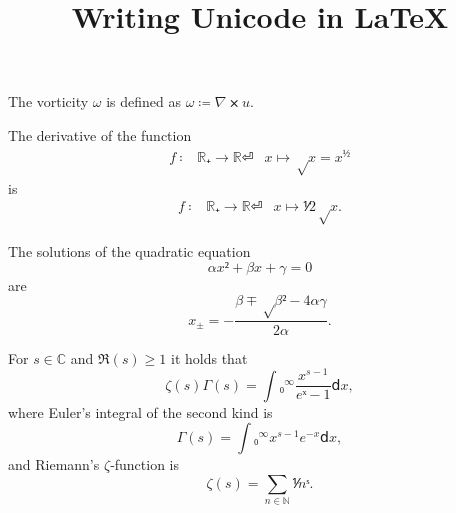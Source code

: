 \documentclass{article}
\title{Writing Unicode in \LaTeX{}}
\begin{document}
	\maketitle
	The vorticity $ω$ is defined as $ω ≔ ∇⨯ u$.

	The derivative of the function
	\begin{align}
		f∶& ℝ₊→ ℝ ⏎
		  &x↦ √x= x^{½}
	\end{align}
	is
	\begin{align}
		f∶& ℝ₊→ ℝ ⏎
		  &x↦ ⅟{2√x}.
	\end{align}

	The solutions of the quadratic equation
	\[	α x²+ β x+ γ= 0 \]
	are
	\[	x_±= -\frac{β ∓ √{β² - 4αγ}}{2α}.\]

	For $s∈ ℂ$ and $ℜ (s)≥ 1$ it holds that
	\[	ζ(s) Γ(s)= ∫₀^∞ \frac{x^{s-1}}{eˣ-1} ⅾx,\]
	where Euler’s integral of the second kind is
	\[	Γ(s)= ∫₀^∞ x^{s-1} e^{-x} ⅾx,\]
	and Riemann’s $ζ$‑function is
	\[	ζ(s)= ∑_{n∈ℕ} ⅟{nˢ}.\]
\end{document}

